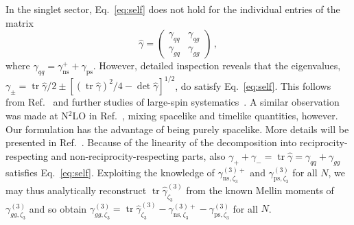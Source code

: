 \documentclass[
 twocolumn,
 superscriptaddress,
 preprintnumbers,
 nofootinbib,
 amsmath,amssymb,
 aps,
 prl
 ]{revtex4-2}
\newcommand{\tr}{\mathop{\mathrm{tr}}\nolimits}
\begin{document}
In the singlet sector, Eq.~\eqref{eq:self} does not hold for the individual entries of the matrix
\begin{equation}
\hat{\gamma}=\left( \begin{array}{cc}
         \gamma_{qq} & \gamma_{qg} \\
         \gamma_{gq} & \gamma_{gg} \end{array} \right)\,,
\label{eq:matrix}
\end{equation}
where $\gamma_{qq}=\gamma_{\mathrm{ns}}^++\gamma_{\mathrm{ps}}$.
However, detailed inspection reveals that the eigenvalues, $\gamma_\pm=\tr\hat{\gamma}/2\pm[(\tr\hat{\gamma})^2/4-\det\hat{\gamma}]^{1/2}$, do satisfy Eq.~\eqref{eq:self}.
This follows from Ref.~\cite{Basso:2006nk} and further studies of large-spin systematics~\cite{Alday:2015eya}.
A similar observation was made at N${}^2$LO in Ref.~\cite{Chen:2020uvt}, mixing spacelike and timelike quantities, however.
Our formulation has the advantage of being purely spacelike.
More details will be presented in Ref.~\cite{Moch-Shumilov-to-appear}.
Because of the linearity of the decomposition into reciprocity-respecting and non-reciprocity-respecting parts, also $\gamma_++\gamma_-=\tr\hat{\gamma}=\gamma_{qq}+\gamma_{gg}$ satisfies Eq.~\eqref{eq:self}.
Exploiting the knowledge of $\gamma_{\mathrm{ns},\zeta_3}^{(3)+}$ \cite{Kniehl:2025jfs,Kniehl:2026axe,Gehrmann:2026qbl} and $\gamma_{\mathrm{ps},\zeta_3}^{(3)}$ \cite{Falcioni:2025hfz} for all $N$, we may thus analytically reconstruct $\tr\hat{\gamma}_{\zeta_3}^{(3)}$ from the known Mellin moments of $\gamma_{gg,\zeta_3}^{(3)}$ \cite{Moch:2021qrk,Moch:2023tdj,Falcioni:2024qpd,Falcioni:2025hfz} and so obtain $\gamma_{gg,\zeta_3}^{(3)}=\tr\hat{\gamma}_{\zeta_3}^{(3)}-\gamma_{\mathrm{ns},\zeta_3}^{(3)+}-\gamma_{\mathrm{ps},\zeta_3}^{(3)}$ for all $N$.
\end{document}
